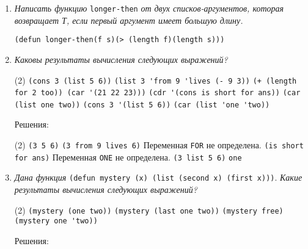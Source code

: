 \begin{enumerate}[wide=0pt]
\begin{tasks}[label=\arabic*), item-indent=3pt, after-item-skip=1pt]
	\task \lstinline|((A B C)|
	\task Функция \lstinline|caddy| не определена. Возможное устранение ошибки: \lstinline|(caddr '(1 2 3 4 5))|
	\task Функция \lstinline|cons| принимает два параметра. Возможное устранение ошибки: \lstinline|(cons 'a '(b c))| или \lstinline|(cons 'a (list 'b 'c))|
	\task Переменные \lstinline|b, c| не определены. Возможное устранение ошибки: \lstinline|(list 'a '(b c))|
	\task \lstinline|(A (B C))|
	\task Поскольку введен запрет на вычисление (quote), конструкция \lstinline|length '(1 2 3)))| будет интерпретирована как данные, а не как функция. Возможное устранение ошибки: \lstinline|(list (+ 1 (length '(1 2 3))))|
\end{tasks}
\item \textit{Написать функцию} \lstinline|longer-then| \textit{от двух списков-аргументов, которая возвращает Т, если первый аргумент имеет большую длину.}
\begin{lstlisting}
(defun longer-then(f s)(> (length f)(length s)))
\end{lstlisting}
\item \textit{Каковы результаты вычисления следующих выражений?}
\begin{tasks}[label=\arabic*), item-indent=3pt, after-item-skip=1pt](2)
	\task \lstinline|(cons 3 (list 5 6))| 
	\task \lstinline|(list 3 'from 9 'lives (- 9 3))|
	\task \lstinline|(+ (length for 2 too)) (car '(21 22 23)))|
	\task \lstinline|(cdr '(cons is short for ans))|
	\task \lstinline|(car (list one two))| 
	\task \lstinline|(cons 3 '(list 5 6))|
	\task \lstinline|(car (list 'one 'two))|
\end{tasks}
Решения:
\begin{tasks}[label=\arabic*), item-indent=3pt, after-item-skip=1pt](2)
	\task \lstinline|(3 5 6)| 
	\task \lstinline|(3 from 9 lives 6)|
	\task  Переменная \lstinline|FOR| не определена.
	\task \lstinline|(is short for ans)|
	\task Переменная \lstinline|ONE| не определена.
	\task \lstinline|(3 list 5 6)|
	\task \lstinline|one|
\end{tasks}
\item \textit{Дана функция} \lstinline|(defun mystery (x) (list (second x) (first x)))|. \textit{Какие результаты вычисления следующих выражений?}
\begin{tasks}[label=\arabic*), item-indent=3pt, after-item-skip=1pt](2)
	\task \lstinline|(mystery (one two))| 
	\task \lstinline|(mystery (last one two))|
	\task \lstinline|(mystery free)|
	\task \lstinline|(mystery one 'two))|
\end{tasks}
Решения:

\end{enumerate}
